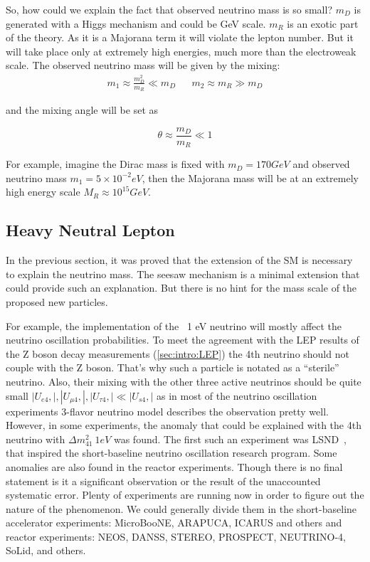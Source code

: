 \documentclass[../main.tex]{subfiles}
\begin{document}
So, how could we explain the fact that observed neutrino mass is so small? $m_D$ is generated with a Higgs mechanism and could be GeV scale. $m_R$ is an exotic part of the theory. As it is a Majorana term it will violate the lepton number. But it will take place only at extremely high energies, much more than the electroweak scale. The observed neutrino mass will be given by the mixing:
\begin{align}
m_1\approx\frac{m_D^2}{m_R} \ll m_D && m_2\approx m_R \gg m_D
\end{align}

and the mixing angle will be set as

\begin{equation}
\theta\approx\frac{m_D}{m_R} \ll 1
\end{equation}

For example, imagine the Dirac mass is fixed with $m_D=170 GeV$ and observed neutrino mass $m_1=5\times 10^{-2} eV$, then the Majorana mass will be at an extremely high energy scale $M_R\approx10^{15}GeV$.

\subsection{Heavy Neutral Lepton}
\label{sec:intro:HNL}
In the previous section, it was proved that the extension of the SM is necessary to explain the neutrino mass. The seesaw mechanism is a minimal extension that could provide such an explanation. But there is no hint for the mass scale of the proposed new particles.

For example, the implementation of the ~1 eV neutrino will mostly affect the neutrino oscillation probabilities. To meet the agreement with the LEP results of the Z boson decay measurements (\autoref{sec:intro:LEP}) the 4th neutrino should not couple with the Z boson. That's why such a particle is notated as a ``sterile'' neutrino. Also, their mixing with the other three active neutrinos should be quite small $\left|U_{e4},\right|, \left|U_{\mu4},\right|, \left|U_{\tau4},\right| \ll \left|U_{s4},\right|$ as in most of the neutrino oscillation experiments 3-flavor neutrino model describes the observation pretty well. However, in some experiments, the anomaly that could be explained with the 4th neutrino with $\Delta m_{41}^2~1eV$ was found. The first such an experiment was LSND~\cite{Athanassopoulos1997}, that inspired the short-baseline neutrino oscillation research program. Some anomalies are also found in the reactor experiments. Though there is no final statement is it a significant observation or the result of the unaccounted systematic error. Plenty of experiments are running now in order to figure out the nature of the phenomenon. We could generally divide them in the short-baseline accelerator experiments: MicroBooNE, ARAPUCA, ICARUS and others and reactor experiments: NEOS, DANSS, STEREO, PROSPECT, NEUTRINO-4, SoLid, and others.
\end{document}
